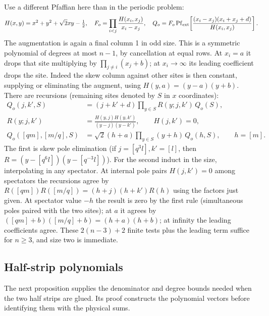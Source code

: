 Use a different Pfaffian here than in the periodic problem:
\[
 H(x,y)=x^2+y^2+\sqrt2 xy-\tfrac12,\quad
 F_o=\prod_{i<j}\frac{H(x_i,x_j)}{x_i-x_j},\quad
 Q_o= F_o\operatorname{Pf}_{\rm ext}\!\left[\frac{(x_i-x_j)(x_i+x_j+d)}{H(x_i,x_j)}\right] .
\]
The augmentation is again a final column 1 in odd size. This is a symmetric polynomial of degrees at most \(n-1\), by cancellation at equal rows. At \(x_i=a\) it drops that site multiplying by \(\prod_{j\ne i}(x_j+b)\); at \(x_i\to\infty\) its leading coefficient drops the site. Indeed the skew column against other sites is then constant, supplying or eliminating the augment, using \(H(y,a)=(y-a)(y+b)\). There are recursions (remaining sites denoted by \(S\) in \(x\) coordinates):
\[
\begin{aligned}
 Q_o(j,k',S)&=(j+k'+d)\prod_{y\in S}R(y;j,k')\,Q_o(S),\\
 R(y;j,k')&=\frac{H(y,j)H(y,k')}{(y-j)(y-k')},\qquad H(j,k')=0,\\
 Q_o([q m],[m/q],S)&=\sqrt2(h+a)\prod_{y\in S}(y+h)\, Q_o(h,S),\qquad h=[m].
\end{aligned}
\]
The first is skew pole elimination (if \(j=[q^3 l],k'=[l]\), then \(R=(y-[q^6 l])(y-[q^{-3}l])\)). For the second induct in the size, interpolating in any spectator. At internal pole pairs \(H(j,k')=0\) among spectators the recursions agree by \(R([q m])R([m/q])=(h+j)(h+k')R(h)\) using the factors just given. At spectator value \(-h\) the result is zero by the first rule (simultaneous poles paired with the two sites); at \(a\) it agrees by \(([q m]+b)([m/q]+b)=(h+a)(h+b)\); at infinity the leading coefficients agree. These \(2(n-3)+2\) finite tests plus the leading term suffice for \(n\ge3\), and size two is immediate.

\subsection{Half-strip polynomials}\label{L:step7}

The next proposition supplies the denominator and degree bounds needed
when the two half strips are glued. Its proof constructs the polynomial
vectors before identifying them with the physical sums.

